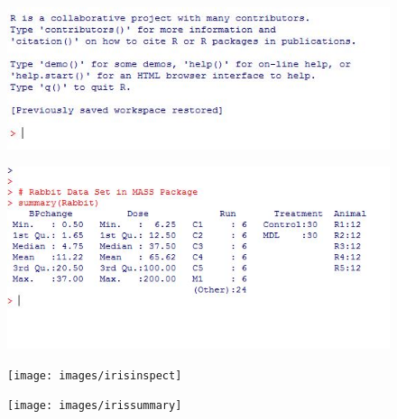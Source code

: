 \documentclass{beamer}
\begin{document}
 
 
 
 \begin{figure}
 \centering
 \includegraphics[width=0.7\linewidth]{images/Rhelpcommands}
 \end{figure}
    
 
 
 \begin{figure}
 \centering
 \includegraphics[width=0.7\linewidth]{images/rabbitsummary}   
 \end{figure}
  
 
 
 
 \begin{figure}  
 \texttt{[image: images/irisinspect]}     
 \end{figure}
    
 
\begin{figure}
\centering
\texttt{[image: images/irissummary]}
\caption{}
\label{fig:irissummary}
\end{figure}
    
 
 
 
\end{document}
